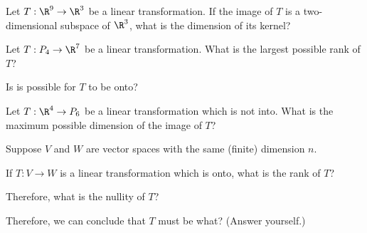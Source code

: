 \endedxtext


\endedxvertical




Let $T: \R^9 \rightarrow \R^3$ be a linear transformation.  If the image of $T$ is a two-dimensional 
subspace of $\R^3$, what is the dimension of its kernel?



\edXsolution{
}

\endedxproblem


Let $T: P_4 \rightarrow \R^7$ be a linear transformation.  What is the largest possible rank of $T$?


Is is possible for $T$ to be onto?  



\edXsolution{
}

\endedxproblem



Let $T: \R^4 \rightarrow P_6$ be a linear transformation which is not into.  What is the maximum possible
dimension of the image of $T$?    



\edXsolution{
}

\endedxproblem



Suppose $V$ and $W$ are vector spaces with the same (finite) dimension $n$.  

If $T: V\rightarrow W$ is a linear transformation which is onto, what is the rank of $T$?  



Therefore, what is the nullity of $T$?  


Therefore, we can conclude that $T$ must be what?  (Answer yourself.)  

\edXsolution{
}

\endedxproblem


